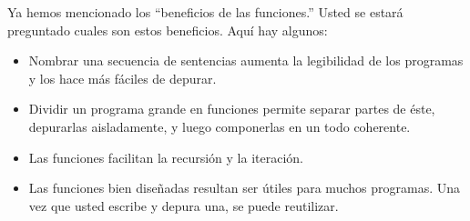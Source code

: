 Ya hemos mencionado los ``beneficios de las funciones.'' Usted se
estará preguntado cuales son estos beneficios. Aquí hay algunos:
\begin{itemize}
\item Nombrar una secuencia de sentencias aumenta la legibilidad de los
programas y los hace más fáciles de depurar.
\item Dividir un programa grande en funciones permite separar partes de
éste, depurarlas aisladamente, y luego componerlas en un todo coherente.
\item Las funciones facilitan la recursión y la iteración.
\item Las funciones bien diseñadas resultan ser útiles para muchos programas.
Una vez que usted escribe y depura una, se puede reutilizar.
\end{itemize}

